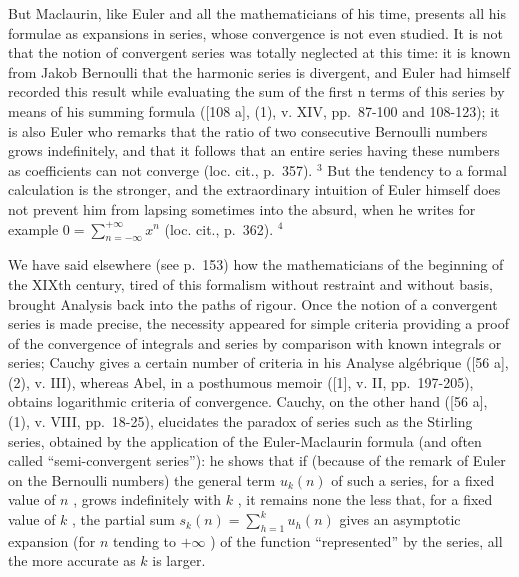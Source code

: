 But Maclaurin, like Euler and all the mathematicians of his time, presents all his formulae as expansions in series, whose convergence is not even studied. It is not that the notion of convergent series was totally neglected at this time: it is known from Jakob Bernoulli that the harmonic series is divergent, and Euler had himself recorded this result while evaluating the sum of the first n terms of this series by means of his summing formula ({[}108 a{]}, (1), v. XIV, pp.~87-100 and 108-123); it is also Euler who remarks that the ratio of two consecutive Bernoulli numbers grows indefinitely, and that it follows that an entire series having these numbers as coefficients can not converge (loc. cit., p.~357). \(^{3}\) But the tendency to a formal calculation is the stronger, and the extraordinary intuition of Euler himself does not prevent him from lapsing sometimes into the absurd, when he writes for example \(0 = \sum_{n=-\infty}^{+\infty} x^{n}\) (loc. cit., p.~362). \(^{4}\)

We have said elsewhere (see p.~153) how the mathematicians of the beginning of the XIXth century, tired of this formalism without restraint and without basis, brought Analysis back into the paths of rigour. Once the notion of a convergent series is made precise, the necessity appeared for simple criteria providing a proof of the convergence of integrals and series by comparison with known integrals or series; Cauchy gives a certain number of criteria in his Analyse algébrique ({[}56 a{]}, (2), v. III), whereas Abel, in a posthumous memoir ({[}1{]}, v. II, pp.~197-205), obtains logarithmic criteria of convergence. Cauchy, on the other hand ({[}56 a{]}, (1), v. VIII, pp.~18-25), elucidates the paradox of series such as the Stirling series, obtained by the application of the Euler-Maclaurin formula (and often called ``semi-convergent series''): he shows that if (because of the remark of Euler on the Bernoulli numbers) the general term \(u_k(n)\) of such a series, for a fixed value of \(n\) , grows indefinitely with \(k\) , it remains none the less that, for a fixed value of \(k\) , the partial sum \(s_k(n) = \sum_{h=1}^{k} u_h(n)\) gives an asymptotic expansion (for \(n\) tending to \(+\infty\) ) of the function ``represented'' by the series, all the more accurate as \(k\) is larger.


